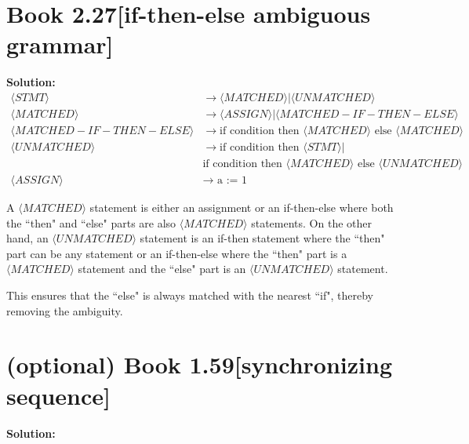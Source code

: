 \documentclass[11pt]{article}
\newenvironment{question}[2]
{\newpage\section{#1\texorpdfstring{\hfill}{horizontal spacing}{\rm\normalsize #2}}}{}
\newenvironment{solution}
{\textbf{Solution: }\color{blue}}
{\color{black}}
\begin{document}
\begin{question}{Book 2.27}{[if-then-else ambiguous grammar]}
\begin{solution}
\begin{equation*}
    \begin{split}
        \langle STMT \rangle &\rightarrow \langle MATCHED \rangle | \langle UNMATCHED \rangle \\
        \langle MATCHED \rangle &\rightarrow \langle ASSIGN \rangle | \langle MATCHED-IF-THEN-ELSE \rangle \\
        \langle MATCHED-IF-THEN-ELSE \rangle &\rightarrow \text{if condition then } \langle MATCHED \rangle \text{ else } \langle MATCHED \rangle \\
        \langle UNMATCHED \rangle &\rightarrow \text{if condition then } \langle STMT \rangle | \\
        &\text{if condition then } \langle MATCHED \rangle \text{ else } \langle UNMATCHED \rangle \\
        \langle ASSIGN \rangle &\rightarrow \text{ a := 1 }
    \end{split}
\end{equation*}

A \(\langle MATCHED \rangle\) statement is either an assignment or an if-then-else where both the ``then" and ``else" parts are also \(\langle MATCHED \rangle\) statements. On the other hand, an \(\langle UNMATCHED \rangle\) statement is an if-then statement where the ``then" part can be any statement or an if-then-else where the ``then" part is a \(\langle MATCHED \rangle\) statement and the ``else" part is an \(\langle UNMATCHED \rangle\) statement.

This ensures that the ``else" is always matched with the nearest ``if", thereby removing the ambiguity.

\end{solution}
\end{question}


\begin{question}{(optional) Book 1.59}{[synchronizing sequence]}


\begin{solution}

\end{solution}
\end{question}
\end{document}

